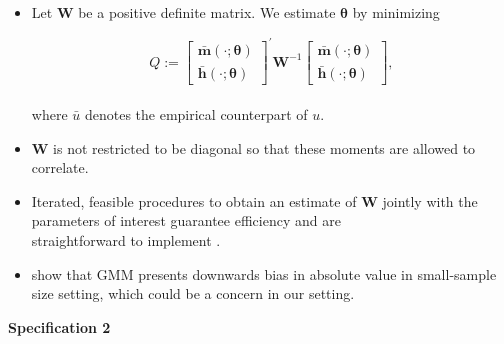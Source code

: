 \documentclass[static]{JJH-Beamer}
\begin{document}
\begin{frame}

\begin{itemize}
\item Let $\bm{W}$ be a positive definite matrix. We estimate $\bm{\theta}$ by minimizing

\begin{equation}
Q :=  {\begin{bmatrix} {\bm{\bar{m}} \left( \cdot ; \bm{\theta} \right) }  \\ {\bm{\bar{h}} \left( \cdot ; \bm{\theta} \right) }  \end{bmatrix}}^{'}
\bm{W} ^{-1}{\begin{bmatrix} {\bm{\bar{m}} \left( \cdot ; \bm{\theta} \right) }  \\ {\bm{\bar{h}} \left( \cdot ; \bm{\theta} \right) }  \end{bmatrix}}, \label{eq:wloss}
\end{equation}\\

\noindent where $\bar{u}$ denotes the empirical counterpart of $u$.

\item $\bm{W}$ is not restricted to be diagonal so that these moments are allowed to correlate.
\item Iterated, feasible procedures to obtain an estimate of $\bm{W}$ jointly with the parameters of interest guarantee efficiency and are \\ straightforward to implement \citep{Hansen_1982_Econometrica,Amemiya_1985_advanced}.
\item \citet{Altonji_Segal_1996_JoBaES} show that GMM presents downwards bias in absolute value in small-sample size setting, which could be a concern in our setting.
\end{itemize}

\end{frame}

\begin{frame}

\begin{center}
\textbf{Specification 2}
\end{center}

\end{frame}
\end{document}

